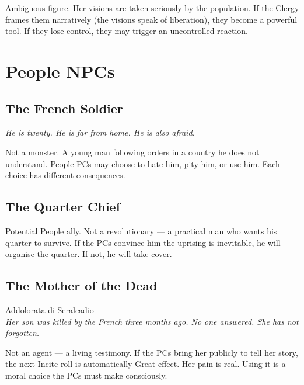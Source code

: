 Ambiguous figure. Her visions are taken seriously by the population.
If the Clergy frames them narratively (the visions speak of liberation),
they become a powerful tool. If they lose control, they may trigger
an uncontrolled reaction.

\secsep

\section{People NPCs}

\subsection{The French Soldier}
\textit{He is twenty. He is far from home. He is also afraid.}


Not a monster. A young man following orders in a country he does not
understand. People PCs may choose to hate him, pity him, or use him.
Each choice has different consequences.


\subsection{The Quarter Chief}

Potential People ally. Not a revolutionary --- a practical man who
wants his quarter to survive. If the PCs convince him the uprising
is inevitable, he will organise the quarter. If not, he will take cover.

\subsection{The Mother of the Dead}
{\cinzel\footnotesize\color{grigionote} Addolorata di Seralcadio}\\
\textit{Her son was killed by the French three months ago. No one answered. She has not forgotten.}


Not an agent --- a living testimony. If the PCs bring her publicly
to tell her story, the next Incite roll is automatically Great effect.
Her pain is real. Using it is a moral choice the PCs must make
consciously.

\filettodoppio
